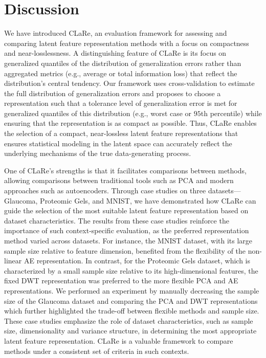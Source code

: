 \section{Discussion}\label{sec:discussion}

We have introduced CLaRe, an evaluation framework for assessing and comparing latent feature representation methods with a focus on compactness and near-losslessness.
A distinguishing feature of CLaRe is its focus on generalized quantiles of the distribution of generalization errors rather than aggregated metrics (e.g., average or total information loss) that reflect the distribution's central tendency.
Our framework uses cross-validation to estimate the full distribution of generalization errors and proposes to choose a representation such that a tolerance level of generalization error is met for generalized quantiles of this distribution (e.g., worst case or $95$th percentile) while ensuring that the representation is as compact as possible.
Thus, CLaRe enables the selection of a compact, near-lossless latent feature representations that ensures statistical modeling in the latent space can accurately reflect the underlying mechanisms of the true data-generating process.

One of CLaRe's strengths is that it facilitates comparisons between methods, allowing comparisons between traditional tools such as PCA and modern approaches such as autoencoders. 
Through case studies on three datasets—Glaucoma, Proteomic Gels, and MNIST, we have demonstrated how CLaRe can guide the selection of the most suitable latent feature representation based on dataset characteristics.
The results from these case studies reinforce the importance of such context-specific evaluation, as the preferred representation method varied across datasets. 
For instance, the MNIST dataset, with its large sample size relative to feature dimension, benefited from the flexibility of the non-linear AE representation. 
In contrast, for the Proteomic Gels dataset, which is characterized by a small sample size relative to its high-dimensional features, the fixed DWT representation was preferred to the more flexible PCA and AE representations.
We performed an experiment by manually decreasing the sample size of the Glaucoma dataset and comparing the PCA and DWT representations which further highlighted the trade-off between flexible methods and sample size.
These case studies emphasize the role of dataset characteristics, such as sample size, dimensionality and variance structure, in determining the most appropriate latent feature representation. 
CLaRe is a valuable framework to compare methods under a consistent set of criteria in such contexts.

